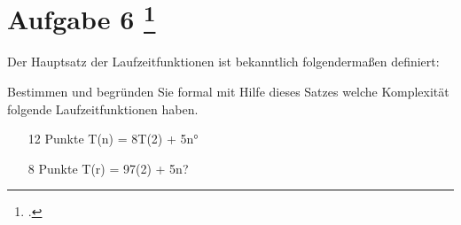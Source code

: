 \documentclass{lehramt-informatik-aufgabe}
\begin{document}
\section{Aufgabe 6
\footcite{66115:2019:09}}

Der Hauptsatz der Laufzeitfunktionen ist bekanntlich folgendermaßen
definiert:

Bestimmen und begründen Sie formal mit Hilfe dieses Satzes welche
Komplexität folgende Laufzeitfunktionen haben.

\begin{enumerate}

\item [12 Punkte] T(n) = 8T(2) + 5n°


\item [8 Punkte] T(r) = 97(2) + 5n?

\end{enumerate}
\end{document}
